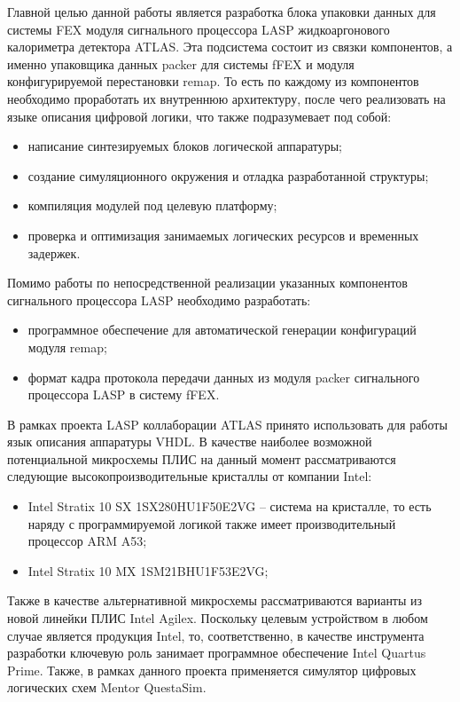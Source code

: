 Главной целью данной работы является разработка блока упаковки данных для системы FEX модуля сигнального процессора LASP жидкоаргонового калориметра детектора ATLAS. Эта подсистема состоит из связки компонентов, а именно упаковщика данных packer для системы fFEX и  модуля конфигурируемой перестановки remap. То есть по каждому из компонентов необходимо проработать их внутреннюю архитектуру, после чего реализовать на языке описания цифровой логики, что также подразумевает под собой:\par
\begin{itemize}
    \item написание синтезируемых блоков логической аппаратуры;
    \item создание симуляционного окружения и отладка разработанной структуры;
    \item компиляция модулей под целевую платформу;
    \item проверка и оптимизация занимаемых логических ресурсов и временных задержек.
\end{itemize}\par
Помимо работы по непосредственной реализации указанных компонентов сигнального процессора LASP необходимо разработать:\par
\begin{itemize}
    \item программное обеспечение для автоматической генерации конфигураций модуля remap;
    \item формат кадра протокола передачи данных из модуля packer сигнального процессора LASP в систему fFEX.
\end{itemize}\par
В рамках проекта LASP коллаборации ATLAS принято использовать для работы язык описания аппаратуры VHDL. В качестве наиболее возможной потенциальной микросхемы ПЛИС на данный момент рассматриваются следующие высокопроизводительные кристаллы от компании Intel:
\begin{itemize}
    \item Intel Stratix 10 SX 1SX280HU1F50E2VG -- система на кристалле, то есть наряду с программируемой логикой также имеет производительный процессор ARM A53;
    \item Intel Stratix 10 MX 1SM21BHU1F53E2VG;
\end{itemize}\par
Также в качестве альтернативной микросхемы рассматриваются варианты из новой линейки ПЛИС Intel Agilex. Поскольку целевым устройством в любом случае является продукция Intel, то, соответственно, в качестве инструмента разработки ключевую роль занимает программное обеспечение Intel Quartus Prime. Также, в рамках данного проекта применяется симулятор цифровых логических схем Mentor QuestaSim.\par
